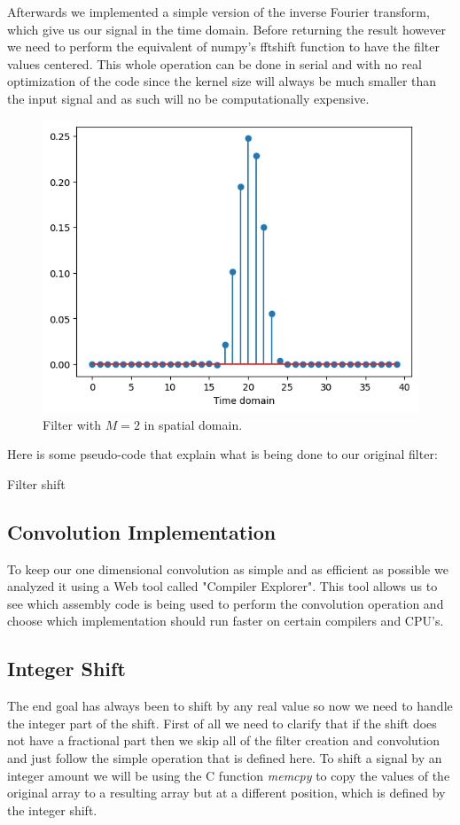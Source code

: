 \documentclass[]{usiinfbachelorproject}
\begin{document}
		 Afterwards we implemented a simple version of the inverse Fourier transform, which give us our signal in the time domain. Before returning the result however we need to perform the equivalent of numpy's fftshift function to have the filter values centered. This whole operation can be done in serial and with no real optimization of the code since the kernel size will always be much smaller than the input signal and as such will no be computationally expensive.
		 \begin{figure}[h]
		 	\centering
		 	\includegraphics[width=0.4\columnwidth]{images/ifft_filter_m_2_25_shift.png}
		 	\caption{Filter with $M=2$ in spatial domain.}
		 	\label{final_filter}
		 \end{figure}
		 
		 
		
		Here is some pseudo-code that explain what is being done to our original filter:
		\begin{algorithm}
			\caption{Filter shift}\label{alg:cap}
		\end{algorithm}
		
		
		\subsection{Convolution Implementation}
		To keep our one dimensional convolution as simple and as efficient as possible we analyzed it using a Web tool called "Compiler Explorer"\cite{godbolt}. This tool allows us to see which assembly code is being used to perform the convolution operation and choose which implementation should run faster on certain compilers and CPU's.
		
		
		
		\subsection{Integer Shift}
		The end goal has always been to shift by any real value so now we need to handle the integer part of the shift. First of all we need to clarify that if the shift does not have a fractional part then we skip all of the filter creation and convolution and just follow the simple operation that is defined here.
		To shift a signal by an integer amount we will be using the C function \textsl{memcpy} to copy the values of the original array to a resulting array but at a different position, which is defined by the integer shift.
		
\end{document}
